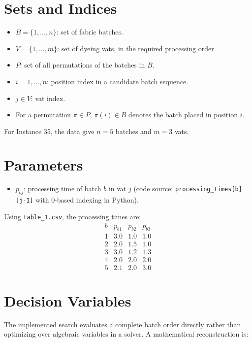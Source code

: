 \section*{Sets and Indices}

\begin{itemize}
    \item $B = \{1,\dots,n\}$: set of fabric batches.
    \item $V = \{1,\dots,m\}$: set of dyeing vats, in the required processing order.
    \item $P$: set of all permutations of the batches in $B$.
    \item $i = 1,\dots,n$: position index in a candidate batch sequence.
    \item $j \in V$: vat index.
    \item For a permutation $\pi \in P$, $\pi(i) \in B$ denotes the batch placed in position $i$.
\end{itemize}

For Instance 35, the data give $n=5$ batches and $m=3$ vats.

\section*{Parameters}

\begin{itemize}
    \item $p_{bj}$: processing time of batch $b$ in vat $j$ (code source: \texttt{processing\_times[b][j-1]} with 0-based indexing in Python).
\end{itemize}

Using \texttt{table\_1.csv}, the processing times are:
\[
\begin{array}{c|ccc}
b & p_{b1} & p_{b2} & p_{b3} \\
\hline
1 & 3.0 & 1.0 & 1.0 \\
2 & 2.0 & 1.5 & 1.0 \\
3 & 3.0 & 1.2 & 1.3 \\
4 & 2.0 & 2.0 & 2.0 \\
5 & 2.1 & 2.0 & 3.0
\end{array}
\]

\section*{Decision Variables}

The implemented search evaluates a complete batch order directly rather than optimizing over algebraic variables in a solver. A mathematical reconstruction is:

